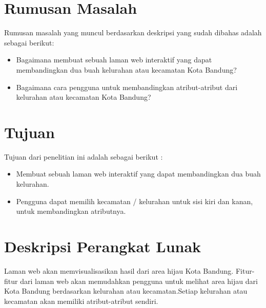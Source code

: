 \documentclass[a4paper,twoside]{article}
\begin{document}



\section{Rumusan Masalah}
Rumusan masalah yang muncul berdasarkan deskripsi yang sudah dibahas
adalah sebagai berikut:
\begin{itemize}
	\item Bagaimana membuat sebuah laman web interaktif yang dapat membandingkan dua buah kelurahan atau kecamatan Kota Bandung?
	\item Bagaimana cara pengguna untuk membandingkan atribut-atribut dari kelurahan atau kecamatan Kota Bandung?
\end{itemize}

\section{Tujuan}
Tujuan dari penelitian ini adalah sebagai berikut :
\begin{itemize}
	\item Membuat sebuah laman web interaktif yang dapat membandingkan dua buah kelurahan.
	\item Pengguna dapat memilih kecamatan / kelurahan untuk sisi kiri dan kanan, untuk membandingkan atributnya.
\end{itemize}

\section{Deskripsi Perangkat Lunak}
Laman web akan memvisualisasikan hasil dari area hijau Kota Bandung. Fitur-fitur dari laman web akan memudahkan pengguna untuk melihat area hijau dari Kota Bandung berdasarkan kelurahan atau kecamatan.Setiap kelurahan atau kecamatan akan memiliki atribut-atribut sendiri.
\end{document}
